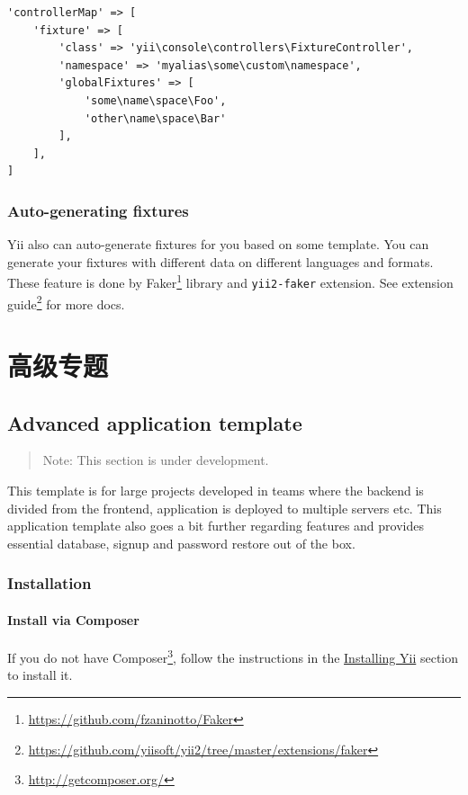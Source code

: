 \begin{lstlisting}
'controllerMap' => [
    'fixture' => [
        'class' => 'yii\console\controllers\FixtureController',
        'namespace' => 'myalias\some\custom\namespace',
        'globalFixtures' => [
            'some\name\space\Foo',
            'other\name\space\Bar'
        ],
    ],
]
\end{lstlisting}
\subsection{Auto-generating fixtures}
Yii also can auto-generate fixtures for you based on some template. You can generate your fixtures with different data on different languages and formats.
These feature is done by Faker\footnote{\url{https://github.com/fzaninotto/Faker}} library and \lstinline|yii2-faker| extension.
See extension guide\footnote{\url{https://github.com/yiisoft/yii2/tree/master/extensions/faker}} for more docs.



\chapter{高级专题}
\label{tutorial-advanced-app.md}\section{Advanced application template}
\begin{quote}Note: This section is under development.

\end{quote}
This template is for large projects developed in teams where the backend is divided from the frontend, application is deployed
to multiple servers etc. This application template also goes a bit further regarding features and provides essential
database, signup and password restore out of the box.

\subsection{Installation}
\subsubsection{Install via Composer}
If you do not have Composer\footnote{\url{http://getcomposer.org/}}, follow the instructions in the
\hyperref[start-installation.md::installing-via-composer]{Installing Yii} section to install it.

